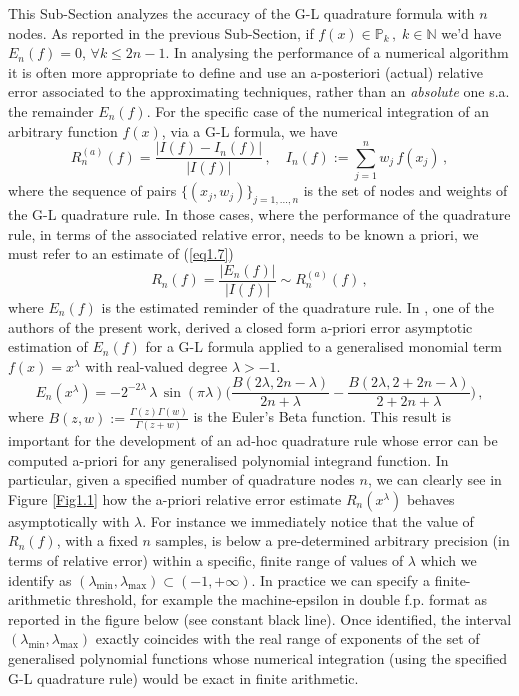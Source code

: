 \documentclass[a4paper, twosided]{book}
\begin{document}
This Sub-Section analyzes the accuracy of the G-L quadrature formula with $n$ nodes. As reported in the previous Sub-Section, if $f(x)\in\mathbb{P}_k\,,\;k\in\mathbb{N}$ we'd have $E_n(f)=0,\,\forall k\leq2n-1$.  
In analysing the performance of a numerical algorithm it is often more appropriate to define and use an a-posteriori (actual) relative error associated to the approximating techniques, rather than an {\itshape absolute} one s.a. the remainder $E_n(f)$. For the specific case of the numerical integration of an arbitrary function $f(x)$, via a G-L formula, we have
\begin{equation}\label{eq1.7}
    R_n^{(a)}(f) = \frac{|I(f)-I_n(f)|}{|I(f)|}\,,\quad I_n(f):=\sum_{j=1}^{n}w_j\,f(x_j)\,,
\end{equation}
\noindent
where the sequence of pairs $\{(x_j,w_j)\}_{j=1,...,n}$ is the set of nodes and weights of the G-L quadrature rule. In those cases, where the performance of the quadrature rule, in terms of the associated relative error, needs to be known a priori, we must refer to an estimate of (\ref{eq1.7}) 
\begin{equation}\label{eq1.8}
    R_n(f) = \frac{|E_n(f)|}{|I(f)|} \sim R_n^{(a)}(f)\,,
\end{equation}
where $E_n(f)$ is the estimated reminder of the quadrature rule. In \cite{Lombardi09}, one of the authors of the present work, derived a closed form a-priori error asymptotic estimation of $E_n(f)$ for a G-L formula applied to a generalised monomial term $f(x)=x^\lambda$ with real-valued degree $\lambda>-1$.
\begin{equation}\label{eq1.9}
    E_n(x^\lambda) = -2^{-2\lambda}\,\lambda\,\sin(\pi \lambda) \bigg(\frac{B(2\lambda,2n-\lambda)}{2n+\lambda} - \frac{B(2\lambda, 2+2n-\lambda)}{2+2n+\lambda}\bigg)\,,
\end{equation}
\noindent
where $B(z,w):=\frac{\Gamma(z)\Gamma(w)}{\Gamma(z+w)}$ is the Euler's Beta function. This result is important for the development of an ad-hoc quadrature rule whose error can be computed a-priori for any generalised polynomial integrand function. In particular, given a specified number of quadrature nodes $n$, we can clearly see in Figure \ref{Fig1.1} how the a-priori relative error estimate $R_n(x^\lambda)$ behaves asymptotically with $\lambda$. For instance we immediately notice that the value of $R_n(f)$, with a fixed $n$ samples, is below a pre-determined arbitrary precision (in terms of relative error) within a specific, finite range of values of $\lambda$ which we identify as $(\lambda_{\text{min}},\lambda_{\text{max}})\subset(-1,+\infty)$. In practice we can specify a finite-arithmetic threshold, for example the machine-epsilon in double f.p. format as reported in the figure below (see constant black line). Once identified, the interval $(\lambda_{\text{min}}, \lambda_{\text{max}})$ exactly coincides with the real range of exponents of the set of generalised polynomial functions whose numerical integration (using the specified G-L quadrature rule) would be exact in finite arithmetic.
\end{document}
